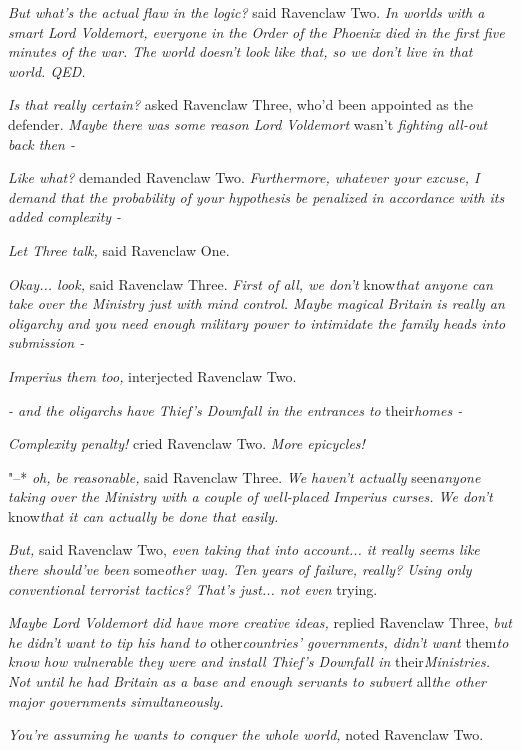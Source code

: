 \emph{But what's the actual flaw in the logic?} said Ravenclaw Two.
\emph{In worlds with a smart Lord Voldemort, everyone in the Order of
the Phoenix died in the first five minutes of the war. The world doesn't
look like that, so we don't live in that world. QED.}

\emph{Is that really certain?} asked Ravenclaw Three, who'd been
appointed as the defender. \emph{Maybe there was some reason Lord
Voldemort} wasn't \emph{fighting all-out back then -}

\emph{Like what?} demanded Ravenclaw Two. \emph{Furthermore, whatever
your excuse, I demand that the probability of your hypothesis be
penalized in accordance with its added complexity -}

\emph{Let Three talk,} said Ravenclaw One.

\emph{Okay... look,} said Ravenclaw Three. \emph{First of all, we
don't} know\emph{that anyone can take over the Ministry just with mind
control. Maybe magical Britain is really an oligarchy and you need
enough military power to intimidate the family heads into submission -}

\emph{Imperius them too,} interjected Ravenclaw Two.

\emph{- and the oligarchs have Thief's Downfall in the entrances to}
their\emph{homes -}

\emph{Complexity penalty!} cried Ravenclaw Two. \emph{More epicycles!}

"--* \emph{oh, be reasonable,} said Ravenclaw Three. \emph{We haven't
actually} seen\emph{anyone taking over the Ministry with a couple of
well-placed Imperius curses. We don't} know\emph{that it can actually be
done that easily.}

\emph{But,} said Ravenclaw Two, \emph{even taking that into
account... it really seems like there should've been}
some\emph{other way. Ten years of failure, really? Using only
conventional terrorist tactics? That's just... not even} trying.

\emph{Maybe Lord Voldemort did have more creative ideas,} replied
Ravenclaw Three, \emph{but he didn't want to tip his hand to}
other\emph{countries' governments, didn't want} them\emph{to know how
vulnerable they were and install Thief's Downfall in}
their\emph{Ministries. Not until he had Britain as a base and enough
servants to subvert} all\emph{the other major governments
simultaneously.}

\emph{You're assuming he wants to conquer the whole world,} noted
Ravenclaw Two.

